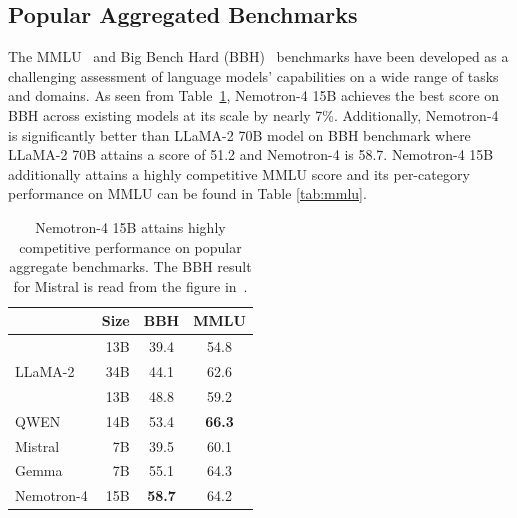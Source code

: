 \documentclass[11pt]{article}
\newcommand{\ours}{Nemotron-4}
\begin{document}
\subsection{Popular Aggregated Benchmarks}

The MMLU~\citep{hendrycks2020measuring} and Big Bench Hard (BBH)~\citep{suzgun2022challenging} benchmarks have been developed as a challenging assessment of language models' capabilities on a wide range of tasks and domains. As seen from  Table~\ref{tab:bbh_mmlu}, \ours{} 15B achieves the best score on BBH across existing models at its scale by nearly 7\%. 
Additionally, \ours{} is significantly better than LLaMA-2 70B model on BBH benchmark where LLaMA-2 70B attains a score of 51.2 and \ours{} is 58.7.
\ours{} 15B additionally attains a highly competitive MMLU score and its per-category performance on MMLU can be found in Table \ref{tab:mmlu}.

\begin{table}[h]
\centering
\begin{tabular}{lrcc} 
\toprule
    & Size & BBH & MMLU     \\ 
\midrule
\multirow{3}{*}{LLaMA-2} & 13B  & 39.4 & 54.8 \\
& 34B & 44.1 & 62.6 \\
\midrule
\multirow{1}{*}{Baichuan-2} & 13B  & 48.8 & 59.2 \\
\midrule
QWEN & 14B & 53.4 & \textbf{66.3} \\
\midrule
Mistral & 7B & 39.5 & 60.1 \\
\midrule
Gemma & 7B & 55.1 & 64.3 \\
\midrule
\ours{} & 15B & \textbf{58.7} & 64.2 \\ 
\bottomrule
\end{tabular}
\caption{\label{tab:bbh_mmlu} \ours{} 15B attains highly competitive performance on popular aggregate benchmarks. The BBH result for Mistral is read from the figure in~\citep{jiang2023mistral}.}
\end{table}
\end{document}
